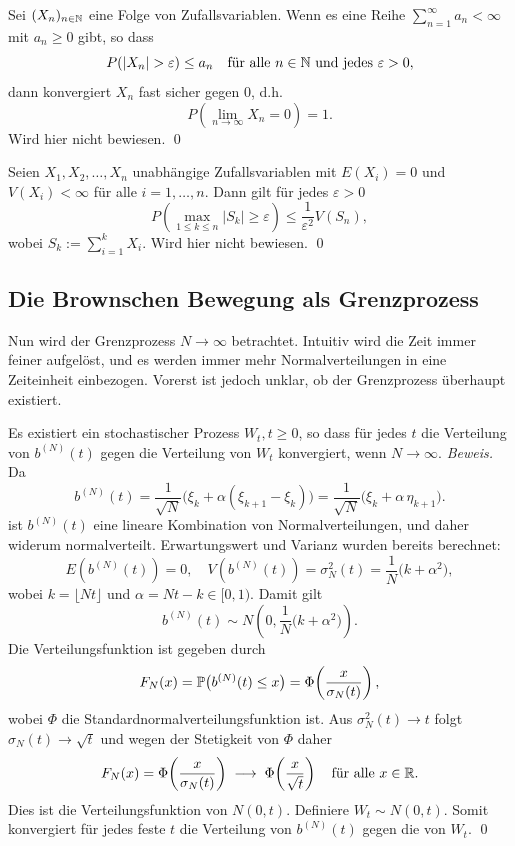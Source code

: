 \begin{lemma}
Sei $(X_n)_{n \in \Bbb N}$ eine Folge von Zufallsvariablen. Wenn es eine Reihe $\sum_{n=1}^\infty a_n \lt \infty$ mit $a_n \geq 0$ gibt, so dass
$$P(|X_n| > \varepsilon) \leq a_n \quad \text{für alle } n \in \Bbb N \text{ und jedes } \varepsilon > 0,$$
dann konvergiert $X_n$ fast sicher gegen $0$, d.h.
$$P\left(\lim_{n \to \infty} X_n = 0\right) = 1.$$
Wird hier nicht bewiesen. \qed
\end{lemma}

\begin{lemma}
Seien $X_1, X_2, \ldots, X_n$ unabhängige Zufallsvariablen mit $E(X_i) = 0$ und $V(X_i) < \infty$ für alle $i=1, \ldots, n$. Dann gilt für jedes $\varepsilon > 0$
$$P\left(\max_{1 \leq k \leq n} |S_k| \geq \varepsilon \right) \leq \frac{1}{\varepsilon^2} V(S_n),$$
wobei $S_k := \sum_{i=1}^k X_i$. Wird hier nicht bewiesen. \qed
\end{lemma}

\subsection{Die Brownschen Bewegung als Grenzprozess}
Nun wird der Grenzprozess $N \to \infty$ betrachtet. Intuitiv wird die Zeit immer feiner aufgelöst,
und es werden immer mehr Normalverteilungen in eine Zeiteinheit einbezogen. Vorerst ist jedoch unklar, 
ob der Grenzprozess überhaupt existiert.

\begin{satz}
Es existiert ein stochastischer Prozess $W_t, t \geq 0$, so dass für jedes $t$ die Verteilung von $b^{(N)}(t)$ gegen die Verteilung von $W_t$ konvergiert, wenn $N \to \infty$.
\textit{Beweis.}
Da 
$$b^{(N)}(t) = \frac{1}{\sqrt{N}}\big(\xi_k+\alpha(\xi_{k+1}-\xi_k)\big)
=\frac{1}{\sqrt{N}}\big(\xi_k+\alpha\,\eta_{k+1}\big).
$$
ist $b^{(N)}(t)$ eine lineare Kombination von Normalverteilungen, und daher widerum 
normalverteilt. Erwartungswert und Varianz wurden bereits berechnet:
$$
E(b^{(N)}(t)) = 0, \quad V(b^{(N)}(t)) = \sigma_N^2(t) = \frac{1}{N}\big(k+\alpha^2\big),
$$
wobei $k=\lfloor Nt \rfloor$ und $\alpha=Nt-k\in[0,1)$. Damit gilt
$$
b^{(N)}(t) \sim N\left(0,\frac{1}{N}\big(k+\alpha^2\big)\right).
$$
Die Verteilungsfunktion ist gegeben durch
$$
F_N(x)=\Bbb P\big(b^{(N)}(t)\le x\big)=\Phi\!\left(\frac{x}{\sigma_N(t)}\right),
$$
wobei $\Phi$ die Standardnormalverteilungsfunktion ist. Aus $\sigma_N^2(t)\to t$ folgt $\sigma_N(t)\to \sqrt{t}$ und wegen der Stetigkeit von $\Phi$ daher
$$
F_N(x)=\Phi\!\left(\frac{x}{\sigma_N(t)}\right)\;\longrightarrow\;\Phi\!\left(\frac{x}{\sqrt{t}}\right)\quad\text{für alle }x\in\Bbb R.
$$
Dies ist die Verteilungsfunktion von $N(0,t)$. Definiere $W_t\sim N(0,t)$. Somit konvergiert für jedes feste $t$ die Verteilung von $b^{(N)}(t)$ gegen die von $W_t$. 
\qed
\end{satz}

